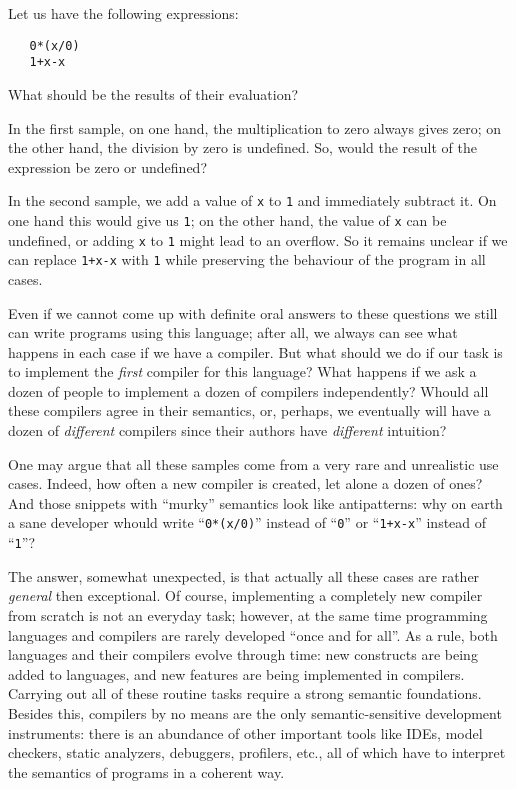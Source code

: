 Let us have the following expressions:

\begin{lstlisting}
   0*(x/0)
   1+x-x  
\end{lstlisting}      

What should be the results of their evaluation?

In the first sample, on one hand, the multiplication to zero always gives zero; on the other hand, the division by zero is undefined. So, would the result of
the expression be zero or undefined?

In the second sample, we add a value of \lstinline|x| to \lstinline|1| and immediately subtract it. On one hand this would give us \lstinline|1|; on the
other hand, the value of \lstinline|x| can be undefined, or adding \lstinline|x| to \lstinline|1| might lead to an overflow. So it remains unclear if we
can replace \lstinline|1+x-x| with \lstinline|1| while preserving the behaviour of the program in all cases.

Even if we cannot come up with definite oral answers to these questions we still can write programs using this language; after all, we always can
see what happens in each case if we have a compiler. But what should we do if our task is to implement the \emph{first} compiler for this language?
What happens if we ask a dozen of people to implement a dozen of compilers independently? Whould all these compilers agree in their semantics, or, perhaps, we
eventually will have a dozen of \emph{different} compilers since their authors have \emph{different} intuition? 

One may argue that all these samples come from a very rare and unrealistic use cases. Indeed, how often a new compiler is created, let alone a
dozen of ones? And those snippets with ``murky'' semantics look like antipatterns: why on earth a sane developer whould write ``\lstinline|0*(x/0)|''
instead of ``\lstinline|0|'' or ``\lstinline|1+x-x|'' instead of ``\lstinline|1|''?

The answer, somewhat unexpected, is that actually all these cases are rather \emph{general} then exceptional. Of course, implementing a completely new compiler from scratch is not an
everyday task; however, at the same time programming languages and compilers are rarely developed ``once and for all''. As a rule, both languages
and their compilers evolve through time: new constructs are being added to languages, and new features are being implemented in compilers. Carrying out all of
these routine tasks require a strong semantic foundations. Besides this, compilers by no means are the only semantic-sensitive development instruments:
there is an abundance of other important tools like IDEs, model checkers, static analyzers, debuggers, profilers, etc., all of which have to interpret the
semantics of programs in a coherent way.

